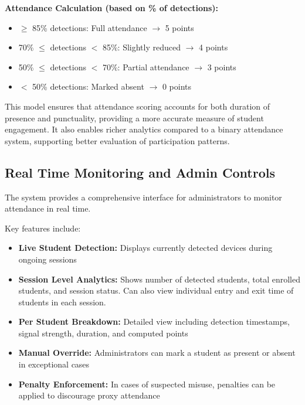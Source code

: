\textbf{Attendance Calculation (based on \% of detections):}

\begin{itemize}
    \item $\geq$ 85\% detections: Full attendance $\rightarrow$ 5 points
    \item 70\% $\leq$ detections $<$ 85\%: Slightly reduced $\rightarrow$ 4 points
    \item 50\% $\leq$ detections $<$ 70\%: Partial attendance $\rightarrow$ 3 points
    \item $<$ 50\% detections: Marked absent $\rightarrow$ 0 points
\end{itemize}

This model ensures that attendance scoring accounts for both duration of presence and punctuality,
providing a more accurate measure of student engagement. It also enables richer analytics compared
to a binary attendance system, supporting better evaluation of participation patterns.



\subsection{Real Time Monitoring and Admin Controls}

The system provides a comprehensive interface for administrators to monitor attendance in real
time.

Key features include:

\begin{itemize}
    \item \textbf{Live Student Detection:} Displays currently detected devices during ongoing sessions
    \item \textbf{Session Level Analytics:} Shows number of detected students, total enrolled students, and
    session status. Can also view individual entry and exit time of students in each session.
    \item \textbf{Per Student Breakdown:} Detailed view including detection timestamps, signal strength,
    duration, and computed points
    \item \textbf{Manual Override:} Administrators can mark a student as present or absent in exceptional
    cases
    \item \textbf{Penalty Enforcement:} In cases of suspected misuse, penalties can be applied to discourage
    proxy attendance
\end{itemize}

